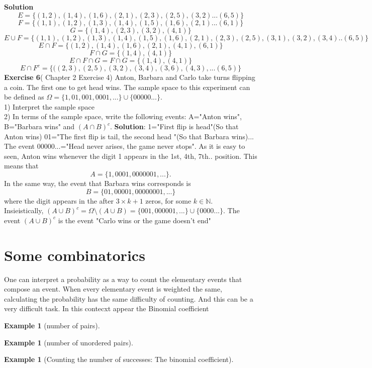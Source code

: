 \documentclass[reqno]{amsart}
\newtheorem{example}[theorem]{Example}
\newcommand{\<}{{\langle \!\! \langle}}
\renewcommand{\>}{{\rangle \!\! \rangle}}
\begin{document}
 \textbf{Solution}
 $$E=\{(1,2),(1,4),(1,6),(2,1),(2,3),(2,5),(3,2)...(6,5)\}$$
 $$F=\{(1,1),(1,2),(1,3),(1,4),(1,5),(1,6),(2,1)...(6,1)\} $$
 $$
 G=\{(1,4),(2,3),(3,2),(4,1)\}
 $$
 $$
 E\cup F=\{(1,1),(1,2),(1,3),(1,4),(1,5),(1,6),
 (2,1),(2,3),(2,5),(3,1),(3,2),(3,4)..(6,5)\}
 $$
 $$E\cap F=\{(1,2),(1,4),(1,6),(2,1),(4,1),(6,1)\}$$
 $$
 F\cap G=\{(1,4),(4,1)\}
 $$
 $$
 E\cap F\cap G=F\cap G=\{(1,4),(4,1)\}
 $$
 $$
 E\cap F^c=\{((2,3),(2,5),(3,2),(3,4),(3,6),(4,3),...(6,5)\}$$
\textbf{Exercise 6}(\cite{Ross} Chapter 2 Exercise 4)
Anton, Barbara  and Carlo take turns flipping a coin. The first one to get head wins. The sample space to this experiment can be defined as $\Omega=\{1,01,001,0001,...\}\cup\{00000...\}$.\\
1) Interpret the sample space\\
2) In terms of the sample space, write the following events: A="Anton wins", B="Barbara wins" and $(A\cap B)^c$.
\textbf{Solution}: 1="First flip is head"(So that Anton wins)  01="The first flip is tail, the second head "(So that Barbara wins)... The event 00000...="Head never arises, the game never stops". 
As it is easy to seen, Anton wins whenever the digit 1 appears in the 1st, 4th, 7th.. position. This means that 
$$
A=\{1,0001,0000001,...\}.
$$
In the same way, the event that Barbara wins corresponds is 
$$B=\{01,00001,00000001,...\}$$
where the digit appears in the after $3\times k+1$ zeros, for some $k\in\mathbb{N}$.\\
Insieistically, $(A\cup B)^c=\Omega\setminus(A\cup B)=\{001,000001,...\}\cup\{0000...\}$.
The event $(A\cup B)^c$ is the event "Carlo wins or the game doesn't end"  

\section{Some combinatorics}
One can interpret a probability as a way to count the elementary events that compose an event. When every elementary event is weighted the same, calculating the probability has the same difficulty of counting. And this can be a very difficult task. In this contecxt appear the Binomial coefficient
\begin{example}[number of pairs]

\end{example}

\begin{example}[number of unordered pairs]
\end{example}

\begin{example}[Counting the number of successes: The binomial coefficient]

\end{example}
\end{document}
